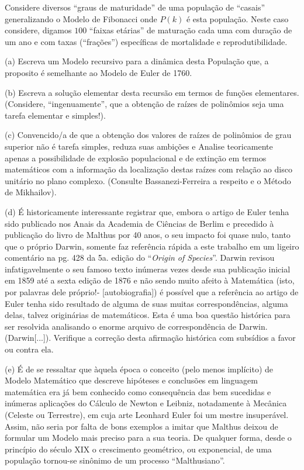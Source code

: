 \begin{exercise}
Considere diversos ``graus de maturidade'' de uma população de ``casais'' generalizando o Modelo de Fibonacci onde \(P(k)\) é esta população. Neste caso considere, digamos \(100\) ``faixas etárias'' de maturação cada uma com duração de um ano e com taxas (``frações'') específicas de mortalidade e reprodutibilidade.

\item (a) Escreva um Modelo recursivo para a dinâmica desta População que, a proposito é semelhante ao Modelo de Euler de 1760.
\item (b) Escreva a solução elementar desta recursão em termos de funções elementares.(Considere, ``ingenuamente'', que a obtenção de raízes de polinômios seja uma tarefa elementar e simples!).
\item (c) Convencido/a de que a obtenção dos valores de raízes de polinômios de grau superior não é tarefa simples, reduza suas ambições e Analise teoricamente apenas a possibilidade de explosão populacional e de extinção em termos matemáticos com a informação da localização destas raízes com relação ao disco unitário no plano complexo. (Consulte Bassanezi-Ferreira a respeito e o Método de Mikhailov).
\item (d) É historicamente interessante registrar que, embora o artigo de Euler tenha sido publicado nos Anais da Academia de Ciências de Berlim e precedido à publicação do livro de Malthus por 40 anos, o seu impacto foi quase nulo, tanto que o próprio Darwin, somente faz referência rápida a este trabalho em um ligeiro comentário na pg. 428 da 5a. edição do ``\textit{Origin of Species}''. Darwin revisou infatigavelmente o seu famoso texto inúmeras vezes desde sua publicação inicial em 1859 até a sexta edição de 1876 e não sendo muito afeito à Matemática (isto, por palavras dele próprio!- [autobiografia]) é possível que a referência ao artigo de Euler tenha sido resultado de alguma de suas muitas correspondências, alguma delas, talvez originárias de matemáticos. Esta é uma boa questão histórica para ser resolvida analisando o enorme arquivo de correspondência de Darwin. (Darwin[...]). Verifique a correção desta afirmação histórica com subsídios a favor ou contra ela.
\item (e) É de se ressaltar que àquela época o conceito (pelo menos implícito) de Modelo Matemático que descreve hipóteses e conclusões em linguagem matemática era já bem conhecido como consequência das bem sucedidas e inúmeras aplicações do Cálculo de Newton e Leibniz, notadamente à Mecânica (Celeste ou Terrestre), em cuja arte Leonhard Euler foi um mestre insuperável. Assim, não seria por falta de bons exemplos a imitar que Malthus deixou de formular um Modelo mais preciso para a sua teoria. De qualquer forma, desde o princípio do século XIX o crescimento geométrico, ou exponencial, de uma população tornou-se sinônimo de um processo ``Malthusiano''.
\end{exercise}




